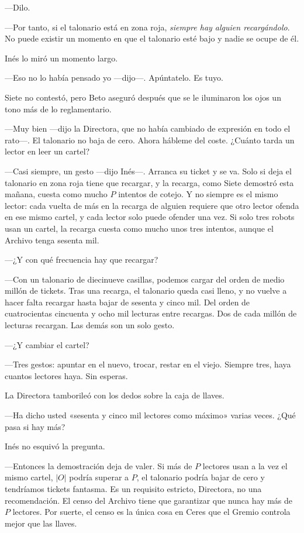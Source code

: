 ---Dilo.

---Por tanto, si el talonario está en zona roja, \emph{siempre hay alguien recargándolo}. No puede existir un momento en que el talonario esté bajo y nadie se ocupe de él.

Inés lo miró un momento largo.

---Eso no lo había pensado yo ---dijo---\nobreak. Apúntatelo. Es tuyo.

Siete no contestó, pero Beto aseguró después que se le iluminaron los ojos un tono más de lo reglamentario.

\escena
---Muy bien ---dijo la Directora, que no había cambiado de expresión en todo el rato---\nobreak. El talonario no baja de cero. Ahora hábleme del coste. ¿Cuánto tarda un lector en leer un cartel?

---Casi siempre, un gesto ---dijo Inés---\nobreak. Arranca su ticket y se va. Solo si deja el talonario en zona roja tiene que recargar, y la recarga, como Siete demostró esta mañana, cuesta como mucho $P$ intentos de cotejo. Y no siempre es el mismo lector: cada vuelta de más en la recarga de alguien requiere que otro lector ofenda en ese mismo cartel, y cada lector solo puede ofender una vez. Si solo tres robots usan un cartel, la recarga cuesta como mucho unos tres intentos, aunque el Archivo tenga sesenta mil.

---¿Y con qué frecuencia hay que recargar?

---Con un talonario de diecinueve casillas, podemos cargar del orden de medio millón de tickets. Tras una recarga, el talonario queda casi lleno, y no vuelve a hacer falta recargar hasta bajar de sesenta y cinco mil. Del orden de cuatrocientas cincuenta y ocho mil lecturas entre recargas. Dos de cada millón de lecturas recargan. Las demás son un solo gesto.

---¿Y cambiar el cartel?

---Tres gestos: apuntar en el nuevo, trocar, restar en el viejo. Siempre tres, haya cuantos lectores haya. Sin esperas.

La Directora tamborileó con los dedos sobre la caja de llaves.

---Ha dicho usted «sesenta y cinco mil lectores como máximo» varias veces. ¿Qué pasa si hay más?

Inés no esquivó la pregunta.

---Entonces la demostración deja de valer. Si más de $P$ lectores usan a la vez el mismo cartel, $|O|$ podría superar a $P$, el talonario podría bajar de cero y tendríamos tickets fantasma. Es un requisito estricto, Directora, no una recomendación. El censo del Archivo tiene que garantizar que nunca hay más de $P$ lectores. Por suerte, el censo es la única cosa en Ceres que el Gremio controla mejor que las llaves.

